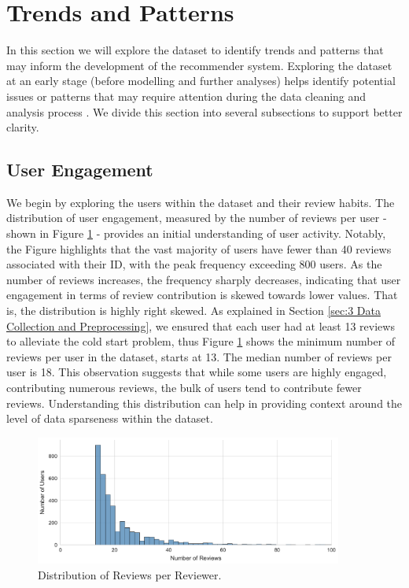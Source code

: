 \section{Trends and Patterns}
\label{sec:3 Trends and Patterns}

In this section we will explore the dataset to identify trends and patterns that may inform the development of the recommender system. Exploring the dataset at an early stage (before modelling and further analyses) helps identify potential issues or patterns that may require attention during the data cleaning and analysis process \cite{witten2005practical}. We divide this section into several subsections to support better clarity. 

\subsection{User Engagement}
\label{subsec:3 User Engagement}


We begin by exploring the users within the dataset and their review habits. The distribution of user engagement, measured by the number of reviews per user - shown in Figure \ref{fig:user review distribution} - provides an initial understanding of user activity. Notably, the Figure highlights that the vast majority of users have fewer than 40 reviews associated with their ID, with the peak frequency exceeding 800 users. As the number of reviews increases, the frequency sharply decreases, indicating that user engagement in terms of review contribution is skewed towards lower values. That is, the distribution is highly right skewed. As explained in Section \ref{sec:3 Data Collection and Preprocessing}, we ensured that each user had at least 13 reviews to alleviate the cold start problem, thus Figure \ref{fig:user review distribution} shows the minimum number of reviews per user in the dataset, starts at 13. The median number of reviews per user is 18. This observation suggests that while some users are highly engaged, contributing numerous reviews, the bulk of users tend to contribute fewer reviews. Understanding this distribution can help in providing context around the level of data sparseness within the dataset.

\begin{figure}[ht]
  \centering
  \includegraphics[width=0.9\textwidth]{Figures/reviews_per_user_distribution.pdf} %
  \caption{Distribution of Reviews per Reviewer.}
  \label{fig:user review distribution}
\end{figure}

